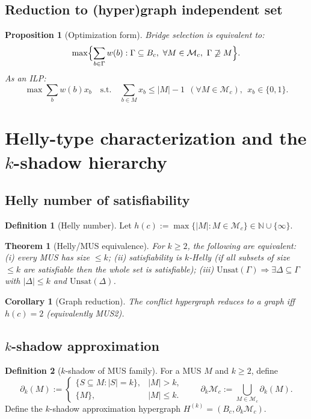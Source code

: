 \documentclass[11pt]{article}
\theoremstyle{definition}
\newtheorem{definition}{Definition}[section]
\theoremstyle{plain}
\newtheorem{theorem}{Theorem}[section]
\newtheorem{proposition}{Proposition}[section]
\newtheorem{corollary}{Corollary}[section]
\theoremstyle{remark}
\newcommand{\bbN}{\mathbb{N}}
\newcommand{\Unsat}{\mathrm{Unsat}}
\begin{document}
\subsection{Reduction to (hyper)graph independent set}
\begin{proposition}[Optimization form]
Bridge selection is equivalent to:
\[
\max\Bigl\{\sum_{b\in\Gamma} w(b): \Gamma\subseteq B_c,\ \forall M\in\mathcal M_c,\ \Gamma\not\supseteq M\Bigr\}.
\]
As an ILP:
\[
\max \sum_{b} w(b)x_b \quad \text{s.t.}\quad \sum_{b\in M} x_b \le |M|-1\ \ (\forall M\in\mathcal M_c),\ \ x_b\in\{0,1\}.
\]
\end{proposition}

\section{Helly-type characterization and the $k$-shadow hierarchy}

\subsection{Helly number of satisfiability}
\begin{definition}[Helly number]
Let $h(c):=\max\{|M|: M\in\mathcal M_c\}\in\bbN\cup\{\infty\}$.
\end{definition}

\begin{theorem}[Helly/MUS equivalence]\label{thm:helly}
For $k\ge 2$, the following are equivalent:
(i) every MUS has size $\le k$;
(ii) satisfiability is $k$-Helly (if all subsets of size $\le k$ are satisfiable then the whole set is satisfiable);
(iii) $\Unsat(\Gamma)\Rightarrow \exists \Delta\subseteq\Gamma$ with $|\Delta|\le k$ and $\Unsat(\Delta)$.
\end{theorem}

\begin{corollary}[Graph reduction]
The conflict hypergraph reduces to a graph iff $h(c)=2$ (equivalently MUS2).
\end{corollary}

\subsection{$k$-shadow approximation}
\begin{definition}[$k$-shadow of MUS family]
For a MUS $M$ and $k\ge 2$, define
\[
\partial_k(M):=
\begin{cases}
\{S\subseteq M:|S|=k\}, & |M|>k,\\
\{M\}, & |M|\le k.
\end{cases}
\qquad
\partial_k\mathcal M_c:=\bigcup_{M\in\mathcal M_c}\partial_k(M).
\]
Define the $k$-shadow approximation hypergraph $H^{(k)}=(B_c,\partial_k\mathcal M_c)$.
\end{definition}
\end{document}
